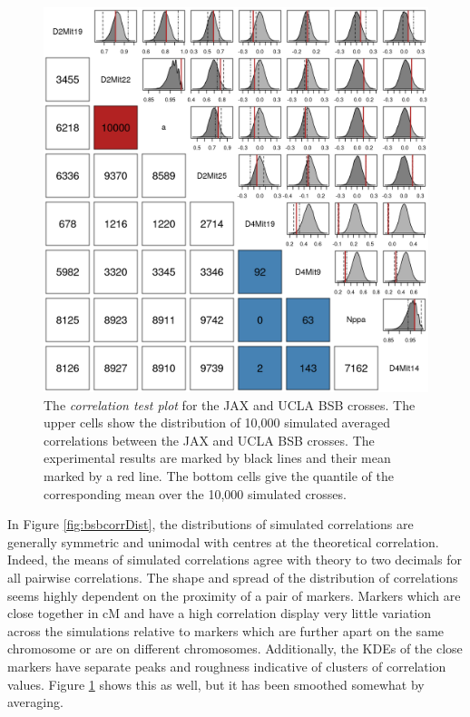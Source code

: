 \documentclass[sts]{imsart}
\begin{document}
\begin{figure}[htp]
  \begin{center}
      \includegraphics[scale = 0.5]{../img/bsbCorrTest.png}
  \end{center}
  \caption{The \emph{correlation test plot} for the JAX and UCLA BSB crosses. The upper cells show the distribution of 10,000 simulated averaged correlations between the JAX and UCLA BSB crosses. The experimental results are marked by black lines and their mean marked by a red line. The bottom cells give the quantile of the corresponding mean over the 10,000 simulated crosses.}
  \label{fig:bsbcorrTest}
\end{figure}

In Figure \ref{fig:bsbcorrDist}, the distributions of simulated correlations are generally symmetric and unimodal with centres at the theoretical correlation. Indeed, the means of simulated correlations agree with theory to two decimals for all pairwise correlations. The shape and spread of the distribution of correlations seems highly dependent on the proximity of a pair of markers. Markers which are close together in cM and have a high correlation display very little variation across the simulations relative to markers which are further apart on the same chromosome or are on different chromosomes. Additionally, the KDEs of the close markers have separate peaks and roughness indicative of clusters of correlation values. Figure \ref{fig:bsbcorrTest} shows this as well, but it has been smoothed somewhat by averaging.
\end{document}
